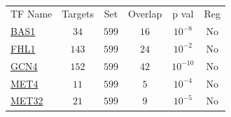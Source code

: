 \begin{table}[h!]
\centering 
{}
\begin{tabular}{l c c c c c}
\hline

TF Name &	Targets &	Set &	Overlap &	p val &	Reg \\ 
\href{www.yeastgenome.org/cgi-bin/locus.fpl?locus=BAS1}{BAS1} &	 $34$ &	$599$&	$16$ &	$10^{-8}$ & 	 No \\ 
\href{www.yeastgenome.org/cgi-bin/locus.fpl?locus=FHL1}{FHL1} &	 $143$ &	$599$&	$24$ &	$10^{-2}$ & 	 No \\ 
\href{www.yeastgenome.org/cgi-bin/locus.fpl?locus=GCN4}{GCN4} &	 $152$ &	$599$&	$42$ &	$10^{-10}$ & 	 No \\ 
\href{www.yeastgenome.org/cgi-bin/locus.fpl?locus=MET4}{MET4} &	 $11$ &	$599$&	$5$ &	$10^{-4}$ & 	 No \\ 
\href{www.yeastgenome.org/cgi-bin/locus.fpl?locus=MET32}{MET32} &	 $21$ &	$599$&	$9$ &	$10^{-5}$ & 	 No \\ 
\hline
\end{tabular} 
\caption[]{}
\label{}
\end{table} 


